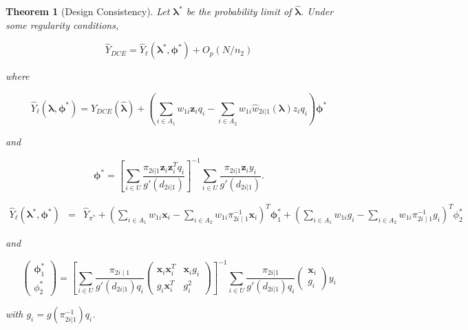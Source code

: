 \documentclass[12pt]{article}
\newtheorem{theorem}{Theorem}
\newcommand{\bx}{\mathbf{x}}
\renewcommand{\bf}[1]{\mathbf{#1}}
\begin{document}
\begin{theorem}[Design Consistency]\label{thm:dc1}
  Let $\bm \lambda^*$ be the probability limit of $\hat{\bm \lambda}$.
  Under some regularity conditions,

  $$\hat Y_{DCE} = \hat Y_\ell(\bm \lambda^*, \bm \phi^*) + O_p(N / n_2)$$

  where

  $$
  \hat Y_{\ell}(\bm \lambda, \bm \phi^*) = \hat Y_{DCE}(\hat{\bm \lambda}) + 
  \left(\sum_{i \in A_1} w_{1i} \bf z_i q_i - \sum_{i \in A_2} w_{1i} \hat w_{2i|1}(
  \bm \lambda) z_i q_i\right)\bm \phi^*
  $$

  and

  $$
  \bm \phi^* = 
  \left[\sum_{i \in U} \frac{\pi_{2i|1}\bf z_i \bf z_i^T q_i}{g'(d_{2i|1})}\right]^{-1}
  \sum_{i \in U} \frac{\pi_{2i|1}\bf z_i y_i}{g'(d_{2i|1})}.
  $$

   \begin{eqnarray*}
   \hat Y_{\ell}(\bm \lambda^*, \bm \phi^*) &=&   \hat{Y}_{\pi^*} + 
  \left(\sum_{i \in A_1} w_{1i} \bf x_i  -  \sum_{i \in A_2} w_{1i} \pi_{2i \mid
  1}^{-1} \bf x_i  \right)^T \bm \phi_1^* + \left(\sum_{i \in A_1} w_{1i} g_i  -
  \sum_{i \in A_2} w_{1i} \pi_{2i \mid 1}^{-1}g_i  \right)^T \phi_2^*  
  \end{eqnarray*} 

  and  

  $$
  \begin{pmatrix}
  \bm \phi_1^* \\
  \phi_2^* 
  \end{pmatrix}
  = \left[ \sum_{i \in U} \frac{\pi_{2i \mid 1} }{ g'(d_{2i|1}) q_i} 
  \begin{pmatrix}
  \bx_i \bx_i^T &   \bx_i g_i   \\
  g_i  \bx_i^T   & g_i^2     
  \end{pmatrix} \right]^{-1}
  \sum_{i \in U} \frac{\pi_{2i|1}}{ g'(d_{2i | 1}) q_i} 
  \begin{pmatrix}
    \bx_i \\ g_i 
  \end{pmatrix}y_i 
  $$

with $g_i = g( \pi_{2i |1}^{-1}) q_i$.
\end{theorem}
\end{document}
